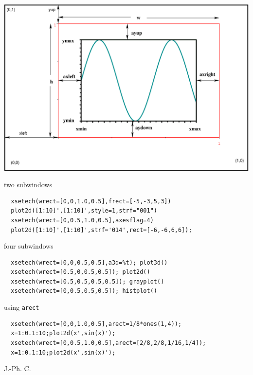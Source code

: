 \begin{mandescription}
    \begin{center}
    \includegraphics{xsetechfig}
    \end{center}
\end{mandescription}

\begin{examples}

\noindent two subwindows 

\begin{Verbatim}
  xsetech(wrect=[0,0,1.0,0.5],frect=[-5,-3,5,3])
  plot2d([1:10]',[1:10]',style=1,strf="001")
  xsetech(wrect=[0,0.5,1.0,0.5],axesflag=4)
  plot2d([1:10]',[1:10]',strf='014',rect=[-6,-6,6,6]);
\end{Verbatim}

\noindent four subwindows

\begin{Verbatim}
  xsetech(wrect=[0,0,0.5,0.5],a3d=%t); plot3d()
  xsetech(wrect=[0.5,0,0.5,0.5]); plot2d()
  xsetech(wrect=[0.5,0.5,0.5,0.5]); grayplot()
  xsetech(wrect=[0,0.5,0.5,0.5]); histplot()
\end{Verbatim}

\noindent using \verb!arect!

\begin{Verbatim}
  xsetech(wrect=[0,0,1.0,0.5],arect=1/8*ones(1,4));
  x=1:0.1:10;plot2d(x',sin(x)');
  xsetech(wrect=[0,0.5,1.0,0.5],arect=[2/8,2/8,1/16,1/4]);
  x=1:0.1:10;plot2d(x',sin(x)');
\end{Verbatim}
\end{examples}
\begin{manseealso}
      
\end{manseealso}

\begin{authors}
  J.-Ph. C.  
\end{authors}

